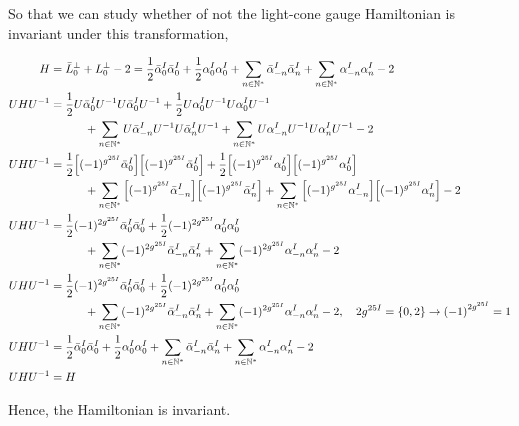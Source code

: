 So that we can study whether of not the light-cone gauge Hamiltonian is invariant under this transformation,

\begin{align*}
    H&={\bar L}_0^\perp+L_0^\perp-2=\frac12{\bar\alpha}_0^I{\bar\alpha}_0^I+\frac12{\alpha}_0^I{\alpha}_0^I+\sum\limits_{n\in\mathbb N^\ast}{\bar\alpha}_{-n}^I{\bar\alpha}_{n}^I+\sum\limits_{n\in\mathbb N^\ast}{\alpha}_{-n}^I{\alpha}_{n}^I-2\\
    UHU^{-1}&=\frac12U{\bar\alpha}_0^IU^{-1}U{\bar\alpha}_0^IU^{-1}+\frac12U{\alpha}_0^IU^{-1}U{\alpha}_0^IU^{-1}\\
    &\quad\quad\quad+\sum\limits_{n\in\mathbb N^\ast}U{\bar\alpha}_{-n}^IU^{-1}U{\bar\alpha}_{n}^IU^{-1}+\sum\limits_{n\in\mathbb N^\ast}U{\alpha}_{-n}^IU^{-1}U{\alpha}_{n}^IU^{-1}-2\\
    UHU^{-1}&=\frac12\qty[(-1)^{g^{25I}}{\bar\alpha}_0^I]\qty[(-1)^{g^{25I}}{\bar\alpha}_0^I]+\frac12\qty[(-1)^{g^{25I}}{\alpha}_0^I]\qty[(-1)^{g^{25I}}{\alpha}_0^I]\\
    &\quad\quad\quad+\sum\limits_{n\in\mathbb N^\ast}\qty[(-1)^{g^{25I}}{\bar\alpha}_{-n}^I]\qty[(-1)^{g^{25I}}{\bar\alpha}_{n}^I]+\sum\limits_{n\in\mathbb N^\ast}\qty[(-1)^{g^{25I}}{\alpha}_{-n}^I]\qty[(-1)^{g^{25I}}{\alpha}_{n}^I]-2\\
    UHU^{-1}&=\frac12(-1)^{2g^{25I}}{\bar\alpha}_0^I{\bar\alpha}_0^I+\frac12(-1)^{2g^{25I}}{\alpha}_0^I{\alpha}_0^I\\
    &\quad\quad\quad+\sum\limits_{n\in\mathbb N^\ast}(-1)^{2g^{25I}}{\bar\alpha}_{-n}^I{\bar\alpha}_{n}^I+\sum\limits_{n\in\mathbb N^\ast}(-1)^{2g^{25I}}{\alpha}_{-n}^I{\alpha}_{n}^I-2\\
    UHU^{-1}&=\frac12(-1)^{2g^{25I}}{\bar\alpha}_0^I{\bar\alpha}_0^I+\frac12(-1)^{2g^{25I}}{\alpha}_0^I{\alpha}_0^I\\
    &\quad\quad\quad+\sum\limits_{n\in\mathbb N^\ast}(-1)^{2g^{25I}}{\bar\alpha}_{-n}^I{\bar\alpha}_{n}^I+\sum\limits_{n\in\mathbb N^\ast}(-1)^{2g^{25I}}{\alpha}_{-n}^I{\alpha}_{n}^I-2,\ \ \ 2g^{25 I}=\qty{0,2}\rightarrow \qty(-1)^{2g^{25I}}=1\\
    UHU^{-1}&=\frac12{\bar\alpha}_0^I{\bar\alpha}_0^I+\frac12{\alpha}_0^I{\alpha}_0^I+\sum\limits_{n\in\mathbb N^\ast}{\bar\alpha}_{-n}^I{\bar\alpha}_{n}^I+\sum\limits_{n\in\mathbb N^\ast}{\alpha}_{-n}^I{\alpha}_{n}^I-2\\
    UHU^{-1}&=H
\end{align*}

Hence, the Hamiltonian is invariant.

